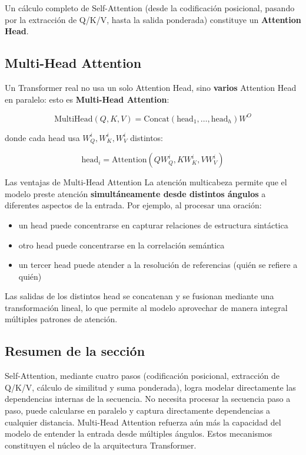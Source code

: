 \documentclass[a4paper]{article}
\begin{document}
Un cálculo completo de Self-Attention (desde la codificación posicional, pasando por la extracción de Q/K/V, hasta la salida ponderada) constituye un \textbf{Attention Head}.

\subsection{Multi-Head Attention}

Un Transformer real no usa un solo Attention Head, sino \textbf{varios} Attention Head en paralelo: esto es \textbf{Multi-Head Attention}:

$$\text{MultiHead}(Q, K, V) = \text{Concat}(\text{head}_1, \ldots, \text{head}_h) W^O$$

donde cada head usa $W_Q^i, W_K^i, W_V^i$ distintos:

$$\text{head}_i = \text{Attention}(Q W_Q^i, K W_K^i, V W_V^i)$$

\begin{importantbox}{Las ventajas de Multi-Head Attention}
La atención multicabeza permite que el modelo preste atención \textbf{simultáneamente desde distintos ángulos} a diferentes aspectos de la entrada. Por ejemplo, al procesar una oración:
\begin{itemize}
    \item un head puede concentrarse en capturar relaciones de estructura sintáctica
    \item otro head puede concentrarse en la correlación semántica
    \item un tercer head puede atender a la resolución de referencias (quién se refiere a quién)
\end{itemize}
Las salidas de los distintos head se concatenan y se fusionan mediante una transformación lineal, lo que permite al modelo aprovechar de manera integral múltiples patrones de atención.
\end{importantbox}

\subsection{Resumen de la sección}

Self-Attention, mediante cuatro pasos (codificación posicional, extracción de Q/K/V, cálculo de similitud y suma ponderada), logra modelar directamente las dependencias internas de la secuencia. No necesita procesar la secuencia paso a paso, puede calcularse en paralelo y captura directamente dependencias a cualquier distancia. Multi-Head Attention refuerza aún más la capacidad del modelo de entender la entrada desde múltiples ángulos. Estos mecanismos constituyen el núcleo de la arquitectura Transformer.
\end{document}
